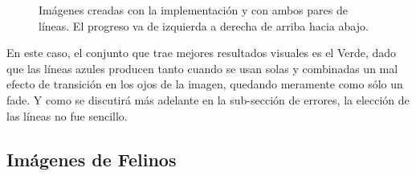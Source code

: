 \documentclass[conference]{IEEEtran}
\begin{document}
\begin{figure}[H]
\begin{multicols}{3}
\end{multicols}
\caption{Imágenes creadas con la implementación y con ambos pares de líneas. El progreso va de izquierda a derecha de arriba hacia abajo.}
\end{figure}

	En este caso, el conjunto que trae mejores resultados visuales es el Verde, dado que las líneas azules producen tanto cuando se usan solas y combinadas un mal efecto de transición en los ojos de la imagen, quedando meramente como sólo un fade. Y como se discutirá más adelante en la sub-sección de errores, la elección de las líneas no fue sencillo.


	\subsection*{Imágenes de Felinos}
\end{document}
